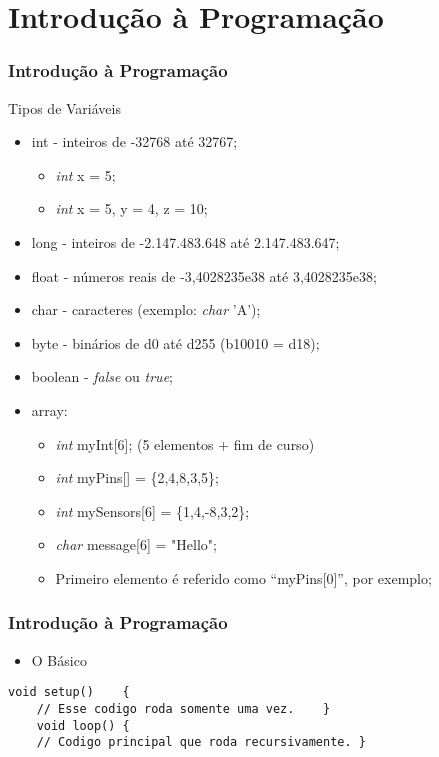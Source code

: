 \documentclass{beamer}
\begin{document}
\section{Introdução à Programação}
\begin{frame}
	\frametitle{Introdução à Programação}
	Tipos de Vari\'aveis
	\begin{itemize}
		\item int - inteiros de -32768 at\'e 32767;
		\begin{itemize}
			\item \textit{int} x = 5;
			\item \textit{int} x = 5, y = 4, z = 10;
		\end{itemize}
		\item long - inteiros de -2.147.483.648 at\'e 2.147.483.647;
		\item float - n\'umeros reais de -3,4028235e38 at\'e 3,4028235e38;
		\item char - caracteres (exemplo: \textit{char} 'A');
		\item byte - binários de d0 até d255 (b10010 = d18);
		\item boolean - \textit{false} ou \textit{true};
		\item array:
		\begin{itemize}
			\item \textit{int} myInt[6]; (5 elementos + fim de curso)
			\item \textit{int} myPins[] = \{2,4,8,3,5\};
			\item \textit{int} mySensors[6] = \{1,4,-8,3,2\};
			\item \textit{char} message[6] = "Hello";
			\item Primeiro elemento é referido como ``myPins[0]'', por exemplo;
		\end{itemize}
	\end{itemize}
\end{frame}

\begin{frame}[fragile]
	\frametitle{Introdução à Programação}
	\begin{itemize}
		\item O B\'asico
	\end{itemize}
	
	\begin{lstlisting}[style=Arduino]
	void setup()	{
	// Esse codigo roda somente uma vez.	}
	void loop()	{
	// Codigo principal que roda recursivamente. }	\end{lstlisting}
\end{frame}
\end{document}
